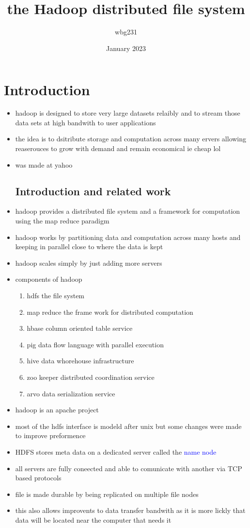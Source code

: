 \documentclass{article}
\title{the Hadoop distributed file system }
\author{wbg231 }
\date{January 2023}
\begin{document}
\maketitle

\section{Introduction}
\begin{itemize}
\item hadoop is designed to store very large datasets relaibly and to stream those data sets at high bandwith to user applications 
\item the idea is to dsitribute storage and computation across many ervers allowing reaserouces to grow with demand and remain economical ie cheap lol
\item was made at yahoo
\subsection*{Introduction and related work }
\item hadoop provides a distributed file system and a framework for computation using the map reduce paradigm 
\item hadoop works by partitioning data and computation across many hosts and keeping in parallel close to where the data is kept 
\item hadoop scales simply by just adding more servers
\item components of hadoop
\begin{enumerate}
    \item hdfs the file system 
    \item map reduce the frame work for distributed computation
    \item hbase column oriented table service
    \item pig data flow language with parallel execution 
    \item hive data whorehouse infrastructure 
    \item zoo keeper distributed coordination service
    \item arvo data serialization service
\end{enumerate}
\item hadoop is an apache project 
\item most of the hdfs interface is modeld after unix but some changes were made to improve preformence
\item HDFS stores meta data on a dedicated server called the \textcolor{blue}{name node}
\item all servers are fully coneected and able to comunicate with another via TCP based protocols
\item file is made durable by being replicated on multiple file nodes
\item this also allows improvents to data transfer bandwith as it is more lickly that data will be located near the computer that needs it 

\end{itemize}
\end{document}
